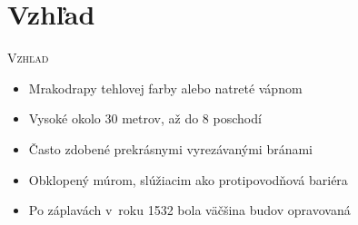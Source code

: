 \documentclass[xcolor=dvipsnames]{beamer}
\begin{document}
\section{Vzhľad}
\begin{frame}{\textsc{Vzhľad}}
\transwipe
	\begin{itemize}
	\item Mrakodrapy tehlovej farby alebo natreté vápnom
	\item Vysoké okolo 30 metrov, až do 8 poschodí
	\item Často zdobené prekrásnymi vyrezávanými bránami
	\item Obklopený múrom, slúžiacim ako protipovodňová bariéra
	\item Po záplavách v~roku 1532 bola väčšina budov opravovaná
	\end{itemize}
	\begin{figure}[ht]
		\begin{center}
			\hspace{1cm} 

\end{center}
\end{figure}
\end{frame}
\end{document}
